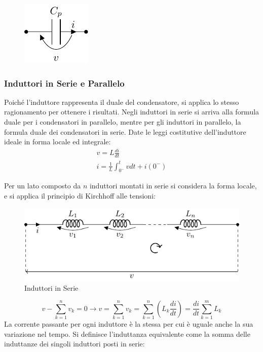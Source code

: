 \documentclass{article}
\numberwithin{equation}{subsection}
\begin{document}
\begin{figure}[H]%
    \centering
    \includegraphics{condensatore-parallelo-equivalente.pdf}%
    \label{fig:condensatore-parallelo-equivalente}
\end{figure}

\subsubsection{Induttori in Serie e Parallelo}

Poiché l'induttore rappresenta il duale del condensatore, si applica lo stesso ragionamento per ottenere i risultati. Negli induttori in serie si arriva alla formula 
duale per i condensatori in parallelo, mentre per gli induttori in parallelo, la formula duale dei condensatori in serie. 
Date le leggi costitutive dell'induttore ideale in forma locale ed integrale:
\begin{gather*}
    v=L\displaystyle\frac{di}{dt}\\
    i=\displaystyle\frac{1}{L}\int_{0^-}^t vdt+i(0^-)
\end{gather*}



Per un lato composto da $n$ induttori montati in serie si considera la forma locale, e si applica il principio di Kirchhoff alle tensioni:
\begin{figure}[H]%
    \centering
    \includegraphics{induttore-serie.pdf}%
    \caption{Induttori in Serie}
    \label{fig:induttore-serie}
\end{figure}

\begin{equation*}
    v-\displaystyle\sum_{k=1}^nv_k=0\to v=\sum_{k=1}^nv_k=\sum_{k=1}^n\left(L_k\frac{di}{dt}\right)=\frac{di}{dt}\sum_{k=1}^mL_k
\end{equation*}
La corrente passante per ogni induttore è la stessa per cui è uguale anche la sua variazione nel tempo. Si definisce l'induttanza equivalente come la somma delle induttanze 
dei singoli induttori posti in serie:
\end{document}
